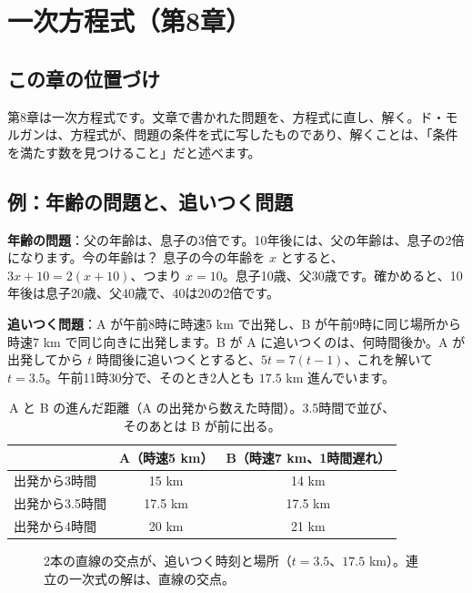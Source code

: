 \documentclass[a4paper,11pt,openany]{ltjsbook}
\begin{document}
\chapter{一次方程式（第8章）}

\section{この章の位置づけ}

第8章は一次方程式です。文章で書かれた問題を、方程式に直し、解く。ド・モルガンは、方程式が、問題の条件を式に写したものであり、解くことは、「条件を満たす数を見つけること」だと述べます。

\section{例：年齢の問題と、追いつく問題}

\textbf{年齢の問題}：父の年齢は、息子の3倍です。10年後には、父の年齢は、息子の2倍になります。今の年齢は？ 息子の今の年齢を $x$ とすると、$3x+10=2(x+10)$、つまり $x=10$。息子10歳、父30歳です。確かめると、10年後は息子20歳、父40歳で、40は20の2倍です。

\textbf{追いつく問題}：A が午前8時に時速5 km で出発し、B が午前9時に同じ場所から時速7 km で同じ向きに出発します。B が A に追いつくのは、何時間後か。A が出発してから $t$ 時間後に追いつくとすると、$5t=7(t-1)$、これを解いて $t=3.5$。午前11時30分で、そのとき2人とも $17.5$ km 進んでいます。

\begin{table}[htbp]
\centering
\begin{tabular}{lcc}
\toprule
 & A（時速5 km） & B（時速7 km、1時間遅れ）\\
\midrule
出発から3時間 & 15 km & 14 km\\
出発から3.5時間 & 17.5 km & 17.5 km\\
出発から4時間 & 20 km & 21 km\\
\bottomrule
\end{tabular}
\caption{A と B の進んだ距離（A の出発から数えた時間）。3.5時間で並び、そのあとは B が前に出る。}
\end{table}

\begin{figure}[htbp]
\centering
{}
\caption{2本の直線の交点が、追いつく時刻と場所（$t=3.5$、$17.5$ km）。連立の一次式の解は、直線の交点。}
\end{figure}
\end{document}

